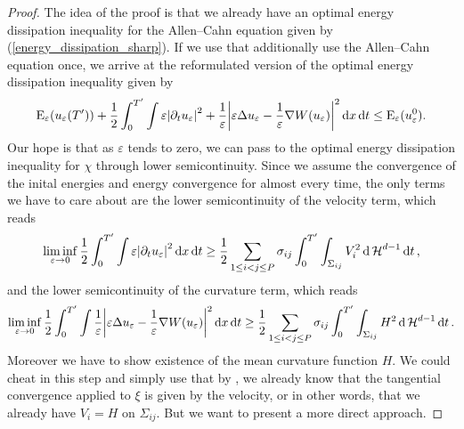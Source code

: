 \begin{proof}
	The idea of the proof is that we already have an optimal energy dissipation 
	inequality for the Allen--Cahn equation given by 
	(\ref{energy_dissipation_sharp}).
	If we use that additionally use the Allen--Cahn equation once, we arrive at 
	the reformulated version of the optimal energy dissipation inequality given 
	by
	\begin{equation*}
	\label{energy_dissipation_sharp_with_curvature}
	\operatorname{E}_{ \varepsilon } ( u_{ \varepsilon } ( T' ) )
	+
	\frac{ 1 }{ 2 }
	\int_{ 0 }^{ T' }
		\int
			\varepsilon \abs{ \partial_{ t } u_{ \varepsilon } }^{ 2 }
			+
			\frac{ 1 }{ \varepsilon }
			\abs{
				\varepsilon \Delta u_{ \varepsilon } 
				-
				\frac{ 1 }{ \varepsilon } \nabla W ( u_{ \varepsilon } )
			}^{ 2 }
		\dd{ x }
	\dd{ t }
	\leq
	\operatorname{E}_{ \varepsilon } ( u_{ \varepsilon}^{ 0 } ).
	\end{equation*}
	Our hope is that as $ \varepsilon $ tends to zero, we can pass to the 
	optimal energy dissipation inequality for $ \chi $ through lower 
	semicontinuity. 
	Since we assume the convergence of the inital energies and energy 
	convergence for almost every time, the only terms we have to care about are 
	the lower semicontinuity of the velocity term, which reads
	\begin{equation}
		\label{lsc_of_velocity}
		\liminf_{ \varepsilon \to 0 }
			\frac{ 1 }{ 2 }
			\int_{ 0 }^{ T' }
				\int
					\varepsilon 
					\abs{ \partial_{ t } u_{ \varepsilon } }^{ 2 }
				\dd{ x }
			\dd{ t }
		\geq
		\frac{ 1 }{ 2 }
		\sum_{ 1 \leq i < j \leq P }
			\sigma_{ i j }
			\int_{ 0 }^{ T' }
				\int_{ \Sigma_{ i j } }
					V_{ i }^{ 2 }
				\dd{ \operatorname{\mathcal{H}}^{ d - 1 } }
			\dd{ t },
	\end{equation}
	and the lower semicontinuity of the curvature term, which reads
	\begin{equation}
		\label{lsc_of_curvature}
		\liminf_{ \varepsilon \to 0 }
			\frac{ 1 }{ 2 }
			\int_{ 0 }^{ T' }
				\int
					\frac{ 1 }{ \varepsilon }
					\abs{
						\varepsilon
						\Delta u_{ \varepsilon }
						-
						\frac{ 1 }{ \varepsilon }
						\nabla W ( u_{ \varepsilon } ) 
					}^{ 2 }
				\dd{ x }
			\dd{ t }
		\geq
		\frac{ 1 }{ 2 }
		\sum_{ 1 \leq i < j \leq P }
			\sigma_{ i j }
			\int_{ 0 }^{ T' }
				\int_{ \Sigma_{ i j } }
					H^{ 2 }
				\dd{ \operatorname{\mathcal{H}}^{ d - 1 } }
			\dd{ t }.
	\end{equation}
	Moreover we have to show existence of the mean curvature function $ H $.
	We could cheat in this step and simply use that by 
	, we already know that the tangential 
	convergence applied to $ \xi $ is given by the velocity, or in other words, 
	that we already have $ V_{ i } = H $ on $ \Sigma_{ i j } $. But we want 
	to present a more direct approach.
	

\end{proof}
